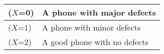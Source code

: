 \begin{tabular}{|l|l|} \hline
($X$=0)& A phone with major defects\\ \hline
($X$=1)& A phone with minor defects  \\ \hline
($X$=2)& A good phone with no defects \\ \hline
\end{tabular}\\\\

